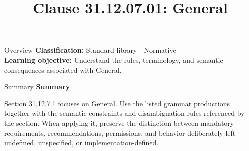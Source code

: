 \documentclass[10pt,letterpaper]{article}
\title{Clause 31.12.07.01: General}
\author{}
\date{}
\begin{document}
\maketitle
\begin{CornellOverviewBox}{Overview}
\textbf{Classification:} Standard library - Normative\\[2pt]
\textbf{Learning objective:} Understand the rules, terminology, and semantic consequences associated with General.
\end{CornellOverviewBox}\begin{CornellSummaryBox}{Summary}
{\sffamily\bfseries\color{Accent} Summary}\par\vspace{3pt}Section 31.12.7.1 focuses on General. Use the listed grammar productions together with the semantic constraints and disambiguation rules referenced by the section. When applying it, preserve the distinction between mandatory requirements, recommendations, permissions, and behavior deliberately left undefined, unspecified, or implementation-defined.
\end{CornellSummaryBox}
\end{document}

